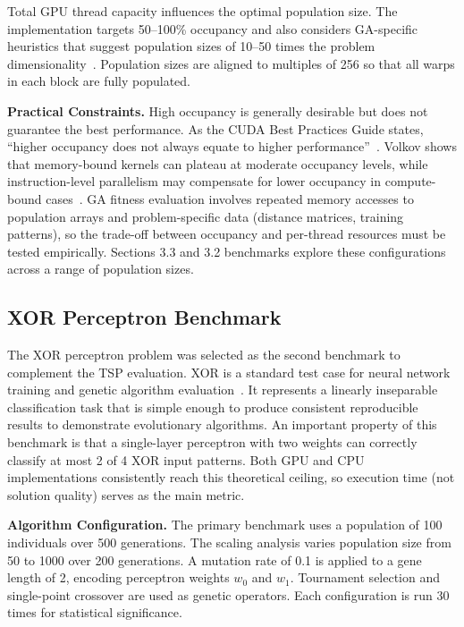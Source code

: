   Total GPU thread capacity influences the optimal population size. The implementation targets 50--100\% occupancy and also considers GA-specific heuristics that suggest population sizes of 10--50 times the problem dimensionality~\cite{katoch2021review}. Population sizes are aligned to multiples of 256 so that all warps in each block are fully populated.

  \textbf{Practical Constraints.} High occupancy is generally desirable but does not guarantee the best performance. As the CUDA Best Practices Guide states, ``higher occupancy does not always equate to higher performance''~\cite{nvidia2024cuda}. Volkov shows that memory-bound kernels can plateau at moderate occupancy levels, while instruction-level parallelism may compensate for lower occupancy in compute-bound cases~\cite{volkov2010occupancy}. GA fitness evaluation involves repeated memory accesses to population arrays and problem-specific data (distance matrices, training patterns), so the trade-off between occupancy and per-thread resources must be tested empirically. Sections 3.3 and 3.2 benchmarks explore these configurations across a range of population sizes.


\newpage
\subsection{XOR Perceptron Benchmark}





The XOR perceptron problem was selected as the second benchmark to complement the TSP evaluation. XOR is a standard test case for neural network training and genetic algorithm evaluation~\cite{googlebooks_xor_perceptron}. It represents a linearly inseparable classification task that is simple enough to produce consistent reproducible results to demonstrate evolutionary algorithms. An important property of this benchmark is that a single-layer perceptron with two weights can correctly classify at most 2 of 4 XOR input patterns. Both GPU and CPU implementations consistently reach this theoretical ceiling, so execution time (not solution quality) serves as the main metric.

\textbf{Algorithm Configuration.} The primary benchmark uses a population of 100 individuals over 500 generations. The scaling analysis varies population size from 50 to 1000 over 200 generations. A mutation rate of 0.1 is applied to a gene length of 2, encoding perceptron weights $w_0$ and $w_1$. Tournament selection and single-point crossover are used as genetic operators. Each configuration is run 30 times for statistical significance.

